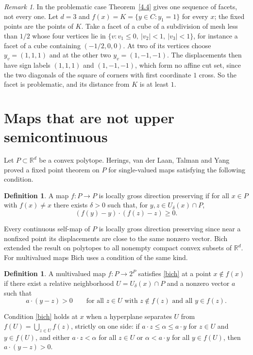 \documentclass[11pt]{amsart}
\theoremstyle{definition}
\newtheorem{defn}[thm]{Definition}
\theoremstyle{remark}
\newtheorem{rem}[thm]{Remark}
\numberwithin{equation}{section}
\newcommand{\R}{\mathbb R}
\begin{document}
\begin{rem}\label{rem:farfacet}
In the problematic case Theorem~\ref{4.4} gives one sequence of facets, not every one. Let $d=3$ and $f(x)=K=\{y\in C:y_1=1\}$ for every $x$; the fixed points are the points of $K$. Take a facet of a cube of a subdivision of mesh less than $1/2$ whose four vertices lie in $\{v:v_1\le0,\ |v_2|<1,\ |v_3|<1\}$, for instance a facet of a cube containing $(-1/2,0,0)$. At two of its vertices choose $y_v=(1,1,1)$ and at the other two $y_v=(1,-1,-1)$. The displacements then have sign labels $(1,1,1)$ and $(1,-1,-1)$, which form no affine cut set, since the two diagonals of the square of corners with first coordinate $1$ cross. So the facet is problematic, and its distance from $K$ is at least $1$.
\end{rem}

\section{Maps that are not upper semicontinuous}\label{sec:sep}
Let $P\subset\R^d$ be a convex polytope. Herings, van der Laan, Talman and Yang \cite{HLTY} proved a fixed point theorem on $P$ for single-valued maps satisfying the following condition.

\begin{defn}\label{lgdp}
A map $f:P\to P$ is locally gross direction preserving if for all $x\in P$ with $f(x)\ne x$ there exists $\delta>0$ such that, for $y,z\in U_\delta(x)\cap P$,
\[
                   (f(y)-y)\cdot(f(z)-z)\ge0 .
\]
\end{defn}
Every continuous self-map of $P$ is locally gross direction preserving since near a nonfixed point its displacements are close to the same nonzero vector. Bich \cite{lmk} extended the result on polytopes to all nonempty compact convex subsets of $\R^d$. For multivalued maps Bich \cite{Bich06} uses a condition of the same kind.

\begin{defn}\label{H}
A multivalued map $f:P\to 2^P$ satisfies \eqref{bich} at a point $x\notin f(x)$ if there exist a relative neighborhood $U=U_\delta(x)\cap P$ and a nonzero vector $a$ such that
\begin{equation}\label{bich}
a\cdot(y-z)>0\qquad\text{for all $z\in U$ with $z\notin f(z)$ and all $y\in f(z)$.}
\end{equation}
\end{defn}
Condition \eqref{bich} holds at $x$ when a hyperplane separates $U$ from $f(U)=\bigcup_{z\in U}f(z)$, strictly on one side: if $a\cdot z\le\alpha\le a\cdot y$ for $z\in U$ and $y\in f(U)$, and either $a\cdot z<\alpha$ for all $z\in U$ or $\alpha<a\cdot y$ for all $y\in f(U)$, then $a\cdot(y-z)>0$.
\end{document}
